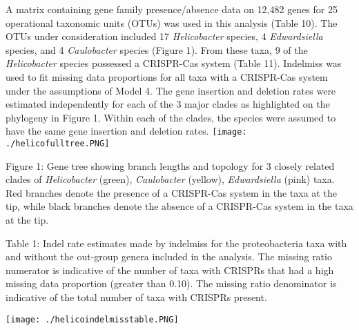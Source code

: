 \documentclass[english]{article}
\begin{document}
A matrix containing gene family presence/absence data on 12,482 genes
for 25 operational taxonomic units (OTUs) was used in this analysis
(Table 10).  The OTUs under consideration included 17
\textit{Helicobacter}
species, 4 \textit{Edwardsiella} species, and 4 \textit{Caulobacter}
species (Figure 1).
From these taxa, 9 of the \textit{Helicobacter} species possessed a CRISPR-Cas
system (Table 11).  Indelmiss was used to fit missing data proportions for
all taxa with a CRISPR-Cas system under the assumptions of Model 4.
The gene insertion and deletion rates were estimated independently for
each of the 3 major clades as highlighted on the phylogeny in Figure
1.  Within each of the clades, the species were assumed to have the
same gene insertion and deletion rates.
\singlespacing
\texttt{[image: ./helicofulltree.PNG]}
\caption{Figure 1: Gene tree showing branch lengths and topology for 3
closely related clades of \textit{Helicobacter} (green), \textit{Caulobacter} (yellow), 
\textit{Edwardsiella} (pink) taxa. Red branches denote the presence of
a CRISPR-Cas system in the taxa at the tip, while black branches
denote the absence of a CRISPR-Cas system in the taxa at the tip.}
\singlespacing
\singlespacing
\caption{Table 1: Indel rate estimates made by indelmiss for the
proteobacteria taxa with and without the out-group genera included in
the analysis. The missing ratio numerator is indicative of the number
of taxa with CRISPRs that had a high missing data proportion (greater
than 0.10).  The missing ratio denominator is indicative of the total
number of taxa with CRISPRs present.}
\newline
\texttt{[image: ./helicoindelmisstable.PNG]}
\singlespacing
\end{document}
